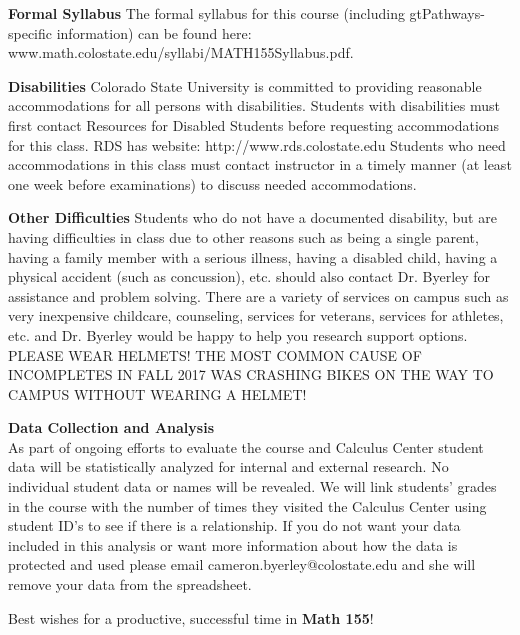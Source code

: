 \documentclass[11pt]{article}
\begin{document}
\vspace{3mm}


\noindent \textbf{Formal Syllabus} 
The formal syllabus for this course (including gtPathways-specific information) can be found here:  www.math.colostate.edu/syllabi/MATH155Syllabus.pdf.

\vspace{3mm}

\noindent \textbf{Disabilities} Colorado State University is committed to providing reasonable accommodations for all persons with disabilities. Students with disabilities must first contact Resources for Disabled Students before requesting accommodations for this class. RDS has website: http://www.rds.colostate.edu  Students who need accommodations in this class must contact instructor in a timely manner (at least one week before examinations) to discuss needed accommodations. 

\noindent \textbf{Other Difficulties}
Students who do not have a documented disability, but are having difficulties in class due to other reasons such as being a single parent, having a family member with a serious illness, having a disabled child, having a physical accident (such as concussion), etc. should also contact Dr. Byerley for assistance and problem solving. There are a variety of services on campus such as very inexpensive childcare, counseling, services for veterans, services for athletes, etc. and Dr. Byerley would be happy to help you research support options. PLEASE WEAR HELMETS! THE MOST COMMON CAUSE OF INCOMPLETES IN FALL 2017 WAS CRASHING BIKES ON THE WAY TO CAMPUS WITHOUT WEARING A HELMET!
\vspace{3mm}


\textbf{Data Collection and Analysis} \\
As part of ongoing efforts to evaluate the course and Calculus Center student data will be statistically analyzed for internal and external research. No individual student data or names will be revealed. We will link students' grades in the course with the number of times they visited the Calculus Center using student ID's to see if there is a relationship. If you do not want your data included in this analysis or want more information about how the data is protected and used please email cameron.byerley@colostate.edu and she will remove your data from the spreadsheet. 

\centerline{Best wishes for a productive, successful time in \textbf{Math 155}!}
\end{document}
